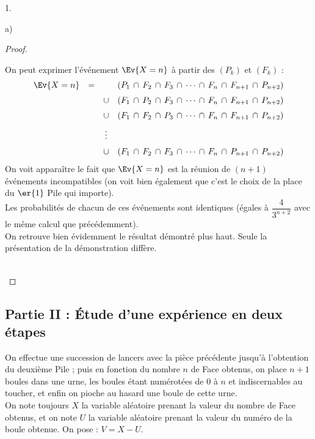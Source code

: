 \begin{noliste}{1.}
\begin{noliste}{a)}
\begin{proof}
      \begin{remark}
        On peut exprimer l'événement $\Ev{X=n}$ à partir des $(P_k)$ 
        et $(F_k)$ :
        \[
          \begin{array}{rccl}
            \Ev{X=n} & = & & (P_1 \, \cap \, F_2 \, \cap \, F_3 \, \cap 
            \, \cdots \, \cap \, F_n \, \cap \, F_{n+1} \, \cap \,
            P_{n+2})
            \\[.2cm]
            & & \cup & (F_1 \, \cap \, P_2 \, \cap \, F_3 \, \cap 
            \, \cdots \, \cap \, F_n \, \cap \, F_{n+1} \, \cap \,
            P_{n+2})
            \\[.2cm]
            & & \cup & (F_1 \, \cap \, F_2 \, \cap \, P_3 \, \cap 
            \, \cdots \, \cap \, F_n \, \cap \, F_{n+1} \, \cap \,
            P_{n+2})
            \\[.2cm]
            & & \vdots &
            \\[.2cm]
            & & \cup & (F_1 \, \cap \, F_2 \, \cap \, F_3 \, \cap 
            \, \cdots \, \cap \, F_n \, \cap \, P_{n+1} \, \cap \,
            P_{n+2})
          \end{array}
        \]
        On voit apparaître le fait que $\Ev{X=n}$ est la réunion de 
	$(n+1)$
        événements incompatibles (on voit bien également que c'est le
        choix de la place du $\er{1}$ Pile qui importe).\\
        Les probabilités de chacun de ces événements sont 
        identiques (égales à $\dfrac{4}{3^{n+2}}$ avec le même 
        calcul que précédemment).\\
        On retrouve bien évidemment le résultat démontré plus haut.
        Seule la présentation de la démonstration diffère.
      \end{remark}~\\[-1.4cm]
    \end{proof}
  \end{noliste}
\end{noliste}



\subsection*{Partie II : Étude d'une expérience en deux étapes}

\noindent
On effectue une succession de lancers avec la pièce précédente jusqu'à 
l'obtention du deuxième Pile ; puis en fonction du nombre $n$ de Face 
obtenus, on place $n+1$ boules dans une urne, les boules étant 
numérotées de $0$ à $n$ et indiscernables au toucher, et enfin on 
pioche au hasard une boule de cette urne.\\[.1cm]
On note toujours $X$ la variable aléatoire prenant la valeur du nombre 
de Face obtenus, et on note $U$ la variable aléatoire prenant la valeur 
du numéro de la boule obtenue. On pose : $V=X-U$.


